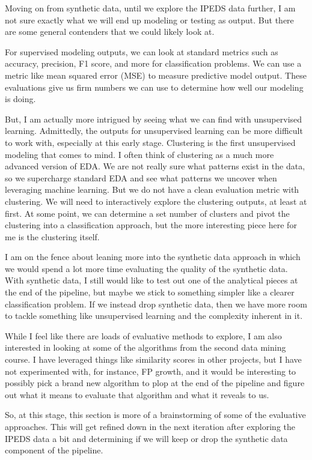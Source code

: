 \documentclass[sigconf, authorversion, nonacm]{acmart}
\begin{document}
    Moving on from synthetic data, until we explore the IPEDS data further, I am not sure exactly what we will end up modeling or testing as output. But there are some general contenders that we could likely look at.

    For supervised modeling outputs, we can look at standard metrics such as accuracy, precision, F1 score, and more for classification problems. We can use a metric like mean squared error (MSE) to measure predictive model output. These evaluations give us firm numbers we can use to determine how well our modeling is doing.

    But, I am actually more intrigued by seeing what we can find with unsupervised learning. Admittedly, the outputs for unsupervised learning can be more difficult to work with, especially at this early stage. Clustering is the first unsupervised modeling that comes to mind. I often think of clustering as a much more advanced version of EDA. We are not really sure what patterns exist in the data, so we supercharge standard EDA and see what patterns we uncover when leveraging machine learning. But we do not have a clean evaluation metric with clustering. We will need to interactively explore the clustering outputs, at least at first. At some point, we can determine a set number of clusters and pivot the clustering into a classification approach, but the more interesting piece here for me is the clustering itself.

    I am on the fence about leaning more into the synthetic data approach in which we would spend a lot more time evaluating the quality of the synthetic data. With synthetic data, I still would like to test out one of the analytical pieces at the end of the pipeline, but maybe we stick to something simpler like a clearer classification problem. If we instead drop synthetic data, then we have more room to tackle something like unsupervised learning and the complexity inherent in it.

    While I feel like there are loads of evaluative methods to explore, I am also interested in looking at some of the algorithms from the second data mining course. I have leveraged things like similarity scores in other projects, but I have not experimented with, for instance, FP growth, and it would be interesting to possibly pick a brand new algorithm to plop at the end of the pipeline and figure out what it means to evaluate that algorithm and what it reveals to us.

    So, at this stage, this section is more of a brainstorming of some of the evaluative approaches. This will get refined down in the next iteration after exploring the IPEDS data a bit and determining if we will keep or drop the synthetic data component of the pipeline.
\end{document}
